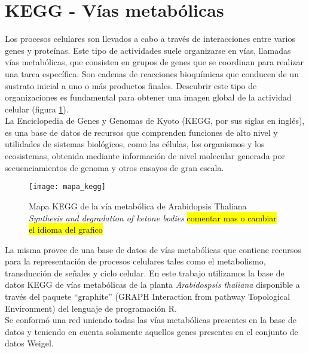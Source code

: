 \section{KEGG - Vías metabólicas}
Los procesos celulares son llevados a cabo a través de interacciones entre varios genes y proteínas. Este tipo de actividades suele organizarse en vías, llamadas vías metabólicas, que consisten en grupos de genes que se coordinan para realizar una tarea específica. Son cadenas de reacciones bioquímicas que conducen de un sustrato inicial a uno o más productos finales. Descubrir este tipo de organizaciones es fundamental para obtener una imagen global de la actividad celular (figura \ref{fig:mapa_kegg}).\\
La Enciclopedia de Genes y Genomas de Kyoto (KEGG, por sus siglas en inglés), es una base de datos de recursos que comprenden funciones de alto nivel y utilidades de sistemas biológicos, como las células, los organismos y los ecosistemas, obtenida mediante información de nivel molecular generada por secuenciamientos de genoma y otros ensayos de gran escala. 
\begin{figure}[h]
    \centering
    \texttt{[image: mapa\_kegg]}
    \caption{Mapa KEGG de la vía metabólica de Arabidopsis Thaliana  \textit{Synthesis and degradation of ketone bodies} \hl{comentar mas o cambiar el idioma del grafico}}
    \label{fig:mapa_kegg}
\end{figure}
La misma provee de una base de datos de vías metabólicas que contiene recursos para la representación de procesos celulares tales como el metabolismo, transducción de señales y ciclo celular. En este trabajo utilizamos la base de datos KEGG de vías metabólicas de la planta \textit{Arabidospsis thaliana} disponible a través del paquete ``graphite'' (GRAPH Interaction from pathway Topological Environment) del lenguaje de programación R.\\
Se conformó una red uniendo todas las vías metabólicas presentes en la base de datos y teniendo en cuenta solamente aquellos genes presentes en el conjunto de datos Weigel.
\cite{Segal2003}\cite{Kanehisa2000}
